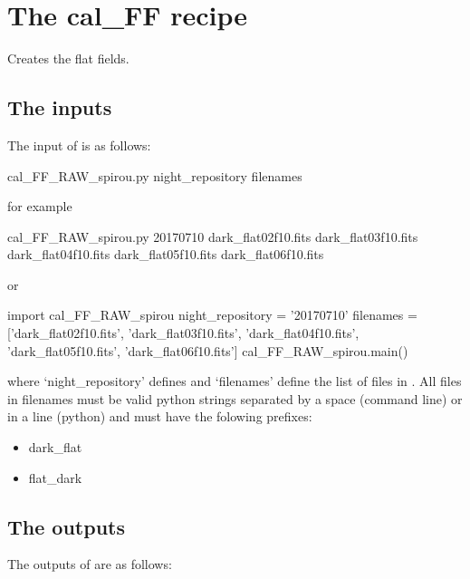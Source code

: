 \clearpage
\newpage
\section{The cal\_FF recipe}
\label{ch:the_recipes:cal_FF_RAW_spirou}

Creates the flat fields. \\ 

\subsection{The inputs}
The input of \calFFraw is as follows:
\begin{cmdbox}
cal_FF_RAW_spirou.py night_repository filenames
\end{cmdbox}
\noindent for example
\begin{cmdbox}[title={example}]
cal_FF_RAW_spirou.py 20170710 dark_flat02f10.fits dark_flat03f10.fits dark_flat04f10.fits dark_flat05f10.fits dark_flat06f10.fits
\end{cmdbox}
\noindent or
\begin{pythonbox}
import cal_FF_RAW_spirou
night_repository = '20170710'
filenames = ['dark_flat02f10.fits', 'dark_flat03f10.fits', 'dark_flat04f10.fits', 
             'dark_flat05f10.fits', 'dark_flat06f10.fits']
cal_FF_RAW_spirou.main()
\end{pythonbox}

\noindent where `night\_repository' defines \argnightname and `filenames' define the list of files in \argfilenames. All files in filenames must be valid python strings separated by a space (command line) or in a line (python) and must have the folowing prefixes:
\begin{itemize}
	\item dark\_flat
	\item flat\_dark
\end{itemize}

\subsection{The outputs}
The outputs of \calFFraw are as follows:

